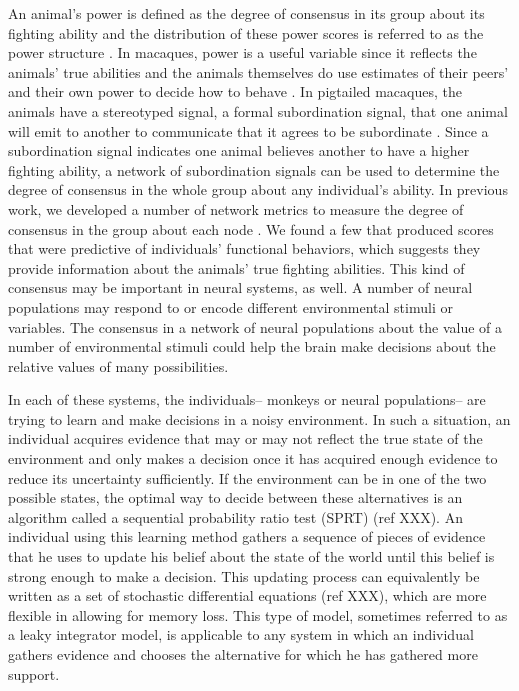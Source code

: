 \documentclass{article}
\begin{document}
An animal's power is defined as the degree of consensus in its group about its fighting ability and the distribution of these power scores is referred to as the power structure \cite{Brush:2013fk,Flack:2004oq,Flack:2006uq,Preuschoft:2004ly}. In macaques, power is a useful variable since it reflects the animals' true abilities and the animals themselves do use estimates of their peers' and their own power to decide how to behave \cite{Flack:2004oq,Flack:2006fk,Flack:2006uq}.  In pigtailed macaques, the animals have a stereotyped signal, a formal subordination signal, that one animal will emit to another to communicate that it agrees to be subordinate \cite{Flack:2004oq,Flack:2006uq,Flack:2007kx,Preuschoft:2004ly}. Since a subordination signal indicates one animal believes another to have a higher fighting ability, a network of subordination signals can be used to determine the degree of consensus in the whole group about any individual's ability.  In previous work, we developed a number of network metrics to measure the degree of consensus in the group about each node \cite{Brush:2013fk,Flack:2006uq}.  We found a few that produced scores that were predictive of individuals' functional behaviors, which suggests they provide information about the animals' true fighting abilities.  This kind of consensus may be important in neural systems, as well.  A number of neural populations may respond to or encode different environmental stimuli or variables.  The consensus in a network of neural populations about the value of a number of environmental stimuli could help the brain make decisions about the relative values of many possibilities. 

In each of these systems, the individuals-- monkeys or neural populations-- are trying to learn and make decisions in a noisy environment.  In such a situation, an individual acquires evidence that may or may not reflect the true state of the environment and only makes a decision once it has acquired enough evidence to reduce its uncertainty sufficiently.  If the environment can be in one of the two possible states, the optimal way to decide between these alternatives is an algorithm called a sequential probability ratio test (SPRT) (ref XXX).  An individual using this learning method gathers a sequence of pieces of evidence that he uses to update his belief about the state of the world until this belief is strong enough to make a decision.  This updating process can equivalently be written as a set of stochastic differential equations (ref XXX), which are more flexible in allowing for memory loss.  This type of model, sometimes referred to as a leaky integrator model, is applicable to any system in which an individual gathers evidence and chooses the alternative for which he has gathered more support.
\end{document}
